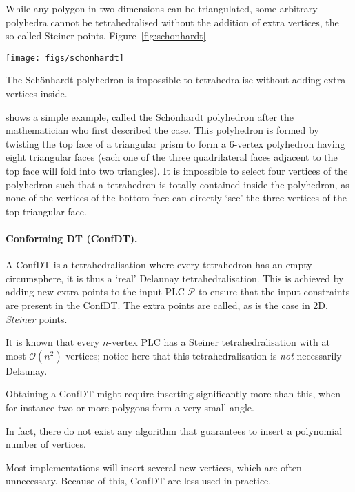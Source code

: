 While any polygon in two dimensions can be triangulated, some arbitrary polyhedra cannot be tetrahedralised without the addition of extra vertices, the so-called Steiner points. 
Figure~\ref{fig:schonhardt}
\begin{marginfigure}
  \centering
  \texttt{[image: figs/schonhardt]}
  \caption[The Sch\"onhardt polyhedron]{The Sch\"onhardt polyhedron is impossible to tetrahedralise without adding extra vertices inside.}%
\label{fig:schonhardt}
\end{marginfigure}
shows a simple example, called the Sch\"onhardt polyhedron after the mathematician who first described the case.
This polyhedron is formed by twisting the top face of a triangular prism to form a 6-vertex polyhedron having eight triangular faces (each one of the three quadrilateral faces adjacent to the top face will fold into two triangles). 
It is impossible to select four vertices of the polyhedron such that a tetrahedron is totally contained inside the polyhedron, as none of the vertices of the bottom face can directly `see' the three vertices of the top triangular face.



\paragraph*{Conforming DT (ConfDT).}

A ConfDT is a tetrahedralisation where every tetrahedron has an empty circumsphere, it is thus a `real' Delaunay tetrahedralisation.   
This is achieved by adding new extra points to the input PLC $\mathcal{P}$ to ensure that the input constraints are present in the ConfDT\@. 
The extra points are called, as is the case in 2D, \emph{Steiner} points.

% 

It is known that every $n$-vertex PLC has a Steiner tetrahedralisation with at most $\mathcal{O}(n^2)$ vertices; notice here that this tetrahedralisation is \emph{not} necessarily Delaunay.

Obtaining a ConfDT might require inserting significantly more than this, when for instance two or more polygons form a very small angle.

In fact, there do not exist any algorithm that guarantees to insert a polynomial number of vertices.

Most implementations will insert several new vertices, which are often unnecessary.
Because of this, ConfDT are less used in practice.


